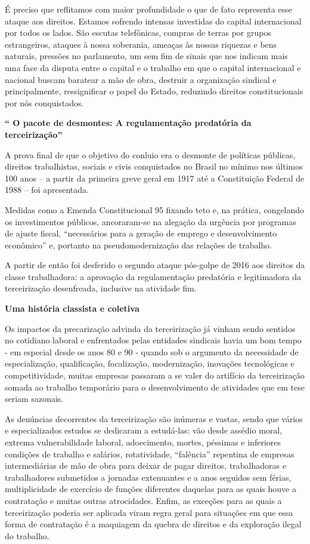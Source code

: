 É preciso que reflitamos com maior profundidade o que de fato representa
esse ataque aos direitos. Estamos sofrendo intensas investidas do
capital internacional por todos os lados. São escutas telefônicas,
compras de terras por grupos estrangeiros, ataques à nossa soberania,
ameaças às nossas riquezas e bens naturais, pressões no parlamento, um
sem fim de sinais que nos indicam mais uma face da disputa entre o
capital e o trabalho em que o capital internacional e nacional buscam
baratear a mão de obra, destruir a organização sindical e
principalmente, ressignificar o papel do Estado, reduzindo direitos
constitucionais por nós conquistados.

\textbf{`` O pacote de desmontes: A regulamentação predatória da
terceirização''}

A prova final de que o objetivo do conluio era o desmonte de políticas
públicas, direitos trabalhistas, sociais e civis conquistados no Brasil
no mínimo nos últimos 100 anos -- a partir da primeira greve geral em
1917 até a Constituição Federal de 1988 -- foi apresentada.

Medidas como a Emenda Constitucional 95 fixando teto e, na prática,
congelando os investimentos públicos, ancoraram-se na alegação da
urgência por programas de ajuste fiscal, ``necessários para a geração de
emprego e desenvolvimento econômico'' e, portanto na pseudomodernização
das relações de trabalho.

A partir de então foi desferido o segundo ataque pós-golpe de 2016 aos
direitos da classe trabalhadora: a aprovação da regulamentação
predatória e legitimadora da terceirização desenfreada, inclusive na
atividade fim.

\textbf{Uma história classista e coletiva}

Os impactos da precarização advinda da terceirização já vinham sendo
sentidos no cotidiano laboral e enfrentados pelas entidades sindicais
havia um bom tempo - em especial desde os anos 80 e 90 - quando sob o
argumento da necessidade de especialização, qualificação, focalização,
modernização, inovações tecnológicas e competitividade, muitas empresas
passaram a se valer do artifício da terceirização somada ao trabalho
temporário para o desenvolvimento de atividades que em tese seriam
sazonais.

As denúncias decorrentes da terceirização são inúmeras e vastas, sendo
que vários e especializados estudos se dedicaram a estudá-las: vão desde
assédio moral, extrema vulnerabilidade laboral, adoecimento, mortes,
péssimas e inferiores condições de trabalho e salários, rotatividade,
``falência'' repentina de empresas intermediárias de mão de obra para
deixar de pagar direitos, trabalhadoras e trabalhadores submetidos a
jornadas extenuantes e a anos seguidos sem férias, multiplicidade de
exercício de funções diferentes daquelas para as quais houve a
contratação e muitas outras atrocidades. Enfim, as exceções para as
quais a terceirização poderia ser aplicada viram regra geral para
situações em que essa forma de contratação é a maquiagem da quebra de
direitos e da exploração ilegal do trabalho.

